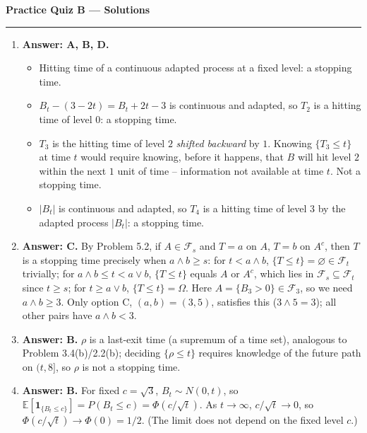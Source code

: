 \documentclass[11pt]{article}
\newcommand{\E}{\mathbb{E}}
\newcommand{\ans}[1]{\par\noindent\textbf{\color{blue!50!black}Answer: #1}}
\begin{document}
\begin{center}
{\LARGE\bfseries Practice Quiz B --- Solutions}
\end{center}
\vspace{6pt}
\hrule
\vspace{10pt}

\begin{enumerate}

\item[\textbf{Q1.}] \ans{A, B, D.}
\begin{itemize}[nosep]
\item[A] Hitting time of a continuous adapted process at a fixed level: a stopping time.
\item[B] $B_t-(3-2t)=B_t+2t-3$ is continuous and adapted, so $T_2$ is a hitting time of level $0$: a stopping time.
\item[C] $T_3$ is the hitting time of level $2$ \emph{shifted backward} by $1$. Knowing $\{T_3\le t\}$ at time $t$ would require knowing, before it happens, that $B$ will hit level $2$ within the next $1$ unit of time -- information not available at time $t$. Not a stopping time.
\item[D] $|B_t|$ is continuous and adapted, so $T_4$ is a hitting time of level $3$ by the adapted process $|B_t|$: a stopping time.
\end{itemize}

\item[\textbf{Q2.}] \ans{C.} By Problem 5.2, if $A\in\mathcal F_s$ and $T=a$ on $A$, $T=b$ on $A^c$, then $T$ is a stopping time precisely when $a\wedge b\ge s$: for $t<a\wedge b$, $\{T\le t\}=\varnothing\in\mathcal F_t$ trivially; for $a\wedge b\le t<a\vee b$, $\{T\le t\}$ equals $A$ or $A^c$, which lies in $\mathcal F_s\subseteq\mathcal F_t$ since $t\ge s$; for $t\ge a\vee b$, $\{T\le t\}=\Omega$. Here $A=\{B_3>0\}\in\mathcal F_3$, so we need $a\wedge b\ge3$. Only option C, $(a,b)=(3,5)$, satisfies this ($3\wedge5=3$); all other pairs have $a\wedge b<3$.

\item[\textbf{Q3.}] \ans{B.} $\rho$ is a last-exit time (a supremum of a time set), analogous to Problem 3.4(b)/2.2(b); deciding $\{\rho\le t\}$ requires knowledge of the future path on $(t,8]$, so $\rho$ is not a stopping time.

\item[\textbf{Q4.}] \ans{B.} For fixed $c=\sqrt3$, $B_t\sim N(0,t)$, so $\E[\mathbf1_{\{B_t\le c\}}]=P(B_t\le c)=\Phi(c/\sqrt t)$. As $t\to\infty$, $c/\sqrt t\to0$, so $\Phi(c/\sqrt t)\to\Phi(0)=1/2$. (The limit does not depend on the fixed level $c$.)


\end{enumerate}
\end{document}
